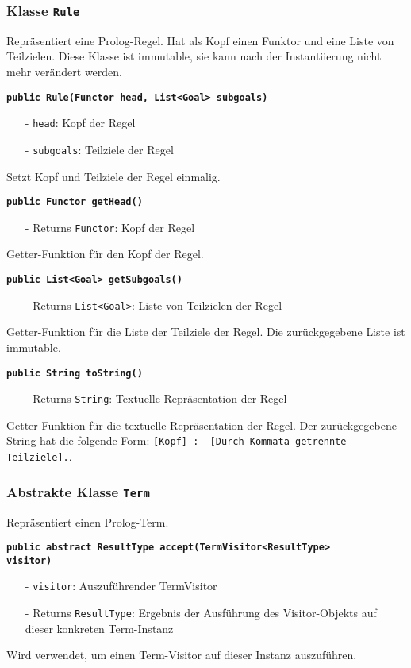 \documentclass[parskip=full,11pt,twoside]{scrartcl}
\begin{document}
\subsubsection{Klasse \texttt{Rule}}
Repräsentiert eine Prolog-Regel. Hat als Kopf einen Funktor und eine Liste von Teilzielen. Diese Klasse ist immutable, sie kann nach der Instantiierung nicht mehr verändert werden.

\textbf{\texttt{public Rule(Functor head, List<Goal> subgoals)}}
\begin{itemize}[noitemsep]
	\item[-] \texttt{head}: Kopf der Regel
	\item[-] \texttt{subgoals}: Teilziele der Regel
\end{itemize}
Setzt Kopf und Teilziele der Regel einmalig.

\textbf{\texttt{public Functor getHead()}}
\begin{itemize}[noitemsep]
	\item[-] Returns \texttt{Functor}: Kopf der Regel
\end{itemize}
Getter-Funktion für den Kopf der Regel.

\textbf{\texttt{public List<Goal> getSubgoals()}}
\begin{itemize}[noitemsep]
	\item[-] Returns \texttt{List<Goal>}: Liste von Teilzielen der Regel
\end{itemize}
Getter-Funktion für die Liste der Teilziele der Regel. Die zurückgegebene Liste ist immutable.

\textbf{\texttt{public String toString()}}
\begin{itemize}[noitemsep]
	\item[-] Returns \texttt{String}: Textuelle Repräsentation der Regel
\end{itemize}
Getter-Funktion für die textuelle Repräsentation der Regel. Der zurückgegebene String hat die folgende Form: \texttt{[Kopf] :- [Durch Kommata getrennte Teilziele].}.
\subsubsection{Abstrakte Klasse \texttt{Term}}
Repräsentiert einen Prolog-Term.

\textbf{\texttt{public abstract ResultType accept(TermVisitor<ResultType>\\visitor)}}
\begin{itemize}[noitemsep]
	\item[-] \texttt{visitor}: Auszuführender TermVisitor
	\item[-] Returns \texttt{ResultType}: Ergebnis der Ausführung des Visitor-Objekts auf dieser konkreten Term-Instanz
\end{itemize}
Wird verwendet, um einen Term-Visitor auf dieser Instanz auszuführen.
\end{document}
